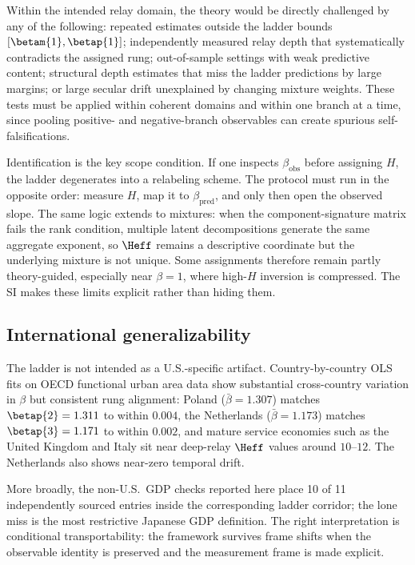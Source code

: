 Within the intended relay domain, the theory would be directly challenged by
any of the following: repeated estimates outside the ladder bounds
$[\betam{1},\betap{1}]$; independently measured relay depth that
systematically contradicts the assigned rung; out-of-sample settings with weak
predictive content; structural depth estimates that miss the ladder predictions
by large margins; or large secular drift unexplained by changing mixture
weights. These tests must be applied within coherent domains and within one
branch at a time, since pooling positive- and negative-branch observables can
create spurious self-falsifications.

Identification is the key scope condition. If one inspects
$\beta_{\mathrm{obs}}$ before assigning $H$, the ladder degenerates into a
relabeling scheme. The protocol must run in the opposite order: measure
$H$, map it to $\beta_{\mathrm{pred}}$, and only then open the observed
slope. The same logic extends to mixtures: when the component-signature matrix
fails the rank condition, multiple latent decompositions generate the same
aggregate exponent, so $\Heff$ remains a descriptive coordinate but the
underlying mixture is not unique. Some assignments therefore remain partly
theory-guided, especially near $\beta=1$, where high-$H$ inversion is
compressed. The SI makes these limits explicit rather than hiding them.

\subsection{International generalizability}
The ladder is not intended as a U.S.-specific artifact. Country-by-country OLS
fits on OECD functional urban area data show substantial cross-country
variation in $\beta$ but consistent rung alignment: Poland
($\bar\beta=1.307$) matches $\betap{2}=1.311$ to within $0.004$, the
Netherlands ($\bar\beta=1.173$) matches $\betap{3}=1.171$ to within
$0.002$, and mature service economies such as the United Kingdom and Italy
sit near deep-relay $\Heff$ values around $10$--$12$. The Netherlands
also shows near-zero temporal drift.

More broadly, the non-U.S.\ GDP checks reported here place 10 of 11
independently sourced entries inside the corresponding ladder corridor; the lone
miss is the most restrictive Japanese GDP definition. The right interpretation
is conditional transportability: the framework survives frame shifts when the
observable identity is preserved and the measurement frame is made explicit.

